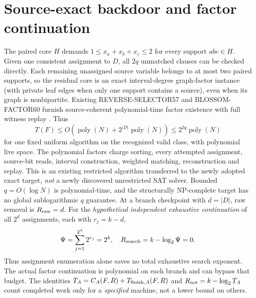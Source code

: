 \documentclass[10pt]{article}
\begin{document}
\section{Source-exact backdoor and factor continuation}
The paired core \(H\) demands \(1\le x_a+x_b+x_c\le2\) for every support \(abc\in H\). Given one consistent assignment to \(D\), all \(2q\) unmatched clauses can be checked directly. Each remaining unassigned source variable belongs to at most two paired supports, so the residual core is an exact interval-degree graph-factor instance (with private leaf edges when only one support contains a source), even when its graph is nonbipartite. Existing REVERSE-SELECTOR57 and BLOSSOM-FACTOR60 furnish source-coherent polynomial-time factor existence with full witness replay \cite{role2rev,role2blossom}. Thus
\[
T(F)\le O\!\left(\operatorname{poly}(N)+2^{|D|}\operatorname{poly}(N)\right)
\le 2^{3q}\operatorname{poly}(N)
\]
for one fixed uniform algorithm on the recognized valid class, with polynomial live space. The polynomial factors charge sorting, every attempted assignment, source-bit reads, interval construction, weighted matching, reconstruction and replay. This is an existing restricted algorithm transferred to the newly adopted exact target, \emph{not} a newly discovered unrestricted SAT solver. Bounded \(q=O(\log N)\) is polynomial-time, and the structurally NP-complete target has no global sublogarithmic \(q\) guarantee.
At a branch checkpoint with \(d=|D|\), raw removal is \(R_{\rm raw}=d\). For the \emph{hypothetical independent exhaustive continuation} of all \(2^d\) assignments, each with \(r_j=k-d\),
\[
\Psi=\sum_{j=1}^{2^d}2^{r_j}=2^k,\quad
R_{\rm search}=k-\log_2\Psi=0.
\]
Thus assignment enumeration alone saves no total exhaustive search exponent. The actual factor continuation is polynomial on each branch and can bypass that budget. The identities \(T_A=C_A(F,R)+T_{{\rm finish},A}(F,R)\) and \(R_{\rm net}=k-\log_2 T_A\) count completed work only for a \emph{specified} machine, not a lower bound on others.
\end{document}
